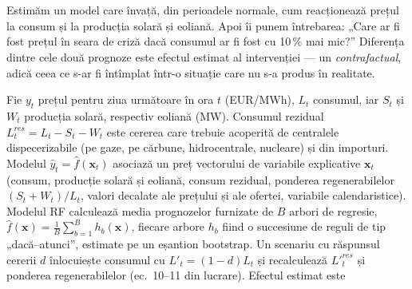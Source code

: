 \section{}
\begin{intuition}
%
{Estimăm un model care învață, din perioadele normale, cum reacționează prețul la consum și la producția solară și eoliană. Apoi îi punem întrebarea: „Care ar fi fost prețul în seara de criză dacă consumul ar fi fost cu 10\,\% mai mic?”
Diferența dintre cele două prognoze este efectul estimat al intervenției --- un \emph{contrafactual}, adică ceea ce s-ar fi întîmplat într-o situație care nu s-a produs în realitate.}
\end{intuition}
%
{Fie $y_t$ prețul pentru ziua următoare în ora $t$ (EUR/MWh), $L_t$ consumul, iar $S_t$ și $W_t$ producția solară, respectiv eoliană (MW). Consumul rezidual
$L^{res}_t = L_t - S_t - W_t$ este cererea care trebuie acoperită de centralele dispecerizabile (pe gaze, pe cărbune, hidrocentrale, nucleare) și din importuri.
Modelul $\hat y_t = \hat f(\mathbf x_t)$ asociază un preț vectorului de variabile explicative $\mathbf x_t$ (consum, producție solară și eoliană, consum rezidual, ponderea regenerabilelor $(S_t+W_t)/L_t$, valori decalate ale prețului și ale ofertei, variabile calendaristice).
Modelul RF calculează media prognozelor furnizate de $B$ arbori de regresie, $\hat f(\mathbf x) = \frac1B\sum_{b=1}^{B} h_b(\mathbf x)$, fiecare arbore $h_b$ fiind o succesiune de reguli de tip „dacă--atunci”, estimate pe un eșantion bootstrap.
Un scenariu cu răspunsul cererii $d$ înlocuiește consumul cu $L'_t = (1-d)L_t$ și recalculează $L'^{res}_t$ și ponderea regenerabilelor (ec.~10--11 din lucrare). Efectul estimat este}

